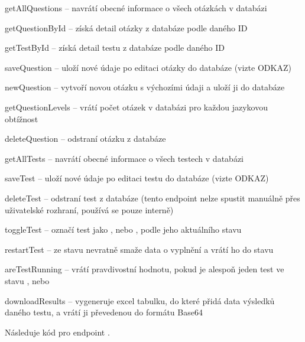 \begin{compactitem}
    \item getAllQuestions -- navrátí obecné informace o všech otázkách v databázi
    \item getQuestionById -- získá detail otázky z databáze podle daného ID
    \item getTestById -- získá detail testu z databáze podle daného ID
    \item saveQuestion -- uloží nové údaje po editaci otázky do databáze (vizte ODKAZ)
    \item newQuestion -- vytvoří novou otázku s výchozími údaji a uloží ji do databáze
    \item getQuestionLevels -- vrátí počet otázek v databázi pro každou jazykovou obtížnost
    \item deleteQuestion -- odstraní otázku z databáze
    \item getAllTests -- navrátí obecné informace o všech testech v databázi
    \item saveTest -- uloží nové údaje po editaci testu do databáze (vizte ODKAZ)
    \item deleteTest -- odstraní test z databáze (tento endpoint nelze spustit manuálně přes uživatelské rozhraní, používá se pouze interně)
    \item toggleTest -- označí test jako , nebo , podle jeho aktuálního stavu
    \item restartTest -- ze stavu  nevratně smaže data o vyplnění a vrátí ho do stavu 
    \item areTestRunning -- vrátí pravdivostní hodnotu, pokud je alespoň jeden test ve stavu , nebo 
    \item downloadResults -- vygeneruje excel tabulku, do které přidá data výsledků daného testu, a vrátí ji převedenou do formátu Base64
\end{compactitem}

Následuje kód pro endpoint .

